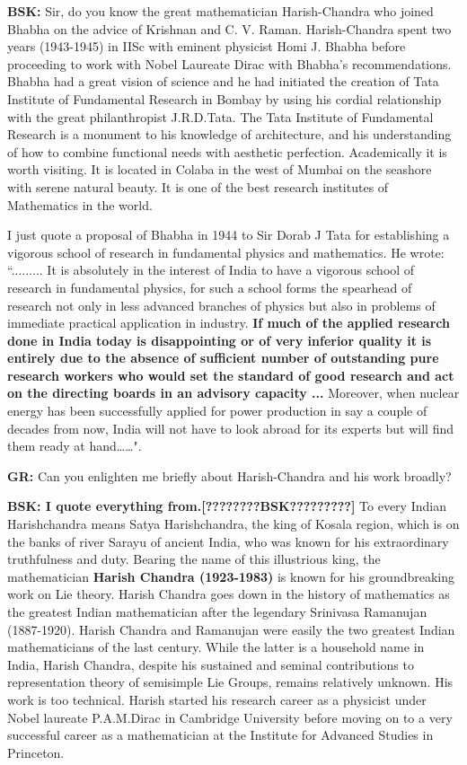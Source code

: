 \textbf{BSK:} Sir, do you know the great mathematician Harish-Chandra who joined Bhabha on the advice of Krishnan and C. V. Raman. Harish-Chandra spent two years (1943-1945) in IISc with eminent physicist Homi J. Bhabha before proceeding to work with Nobel Laureate Dirac with Bhabha’s recommendations.  Bhabha had a great vision of science and he had initiated the creation of Tata Institute of Fundamental Research in Bombay by using his cordial relationship with the great philanthropist J.R.D.Tata.  The Tata Institute of Fundamental Research is a monument to his knowledge of architecture, and his understanding of how to combine functional needs with aesthetic perfection. Academically it is worth visiting. It is located in Colaba in the west of Mumbai on the seashore with serene natural beauty. It is one of the best research institutes of Mathematics in the world.

I just quote a proposal \cite{chap13-key09SM} of Bhabha in 1944 to Sir Dorab J Tata for establishing a vigorous school of research in fundamental physics and mathematics.  He wrote:  ``......... It is absolutely in the interest of India to have a vigorous school of research in fundamental physics, for such a school forms the spearhead of research not only in less advanced branches of physics but also in problems of immediate practical application in industry. \textbf{If much of the applied research done in India today is disappointing or of very inferior quality it is entirely due to the absence of sufficient number of outstanding pure research workers who would set the standard of good research and act on the directing boards in an advisory capacity ...} Moreover, when nuclear energy has been successfully applied for power production in say a couple of decades from now, India will not have to look abroad for its experts but will find them ready at hand……".

\textbf{GR:} Can you enlighten me briefly about Harish-Chandra and his work broadly? 

\textbf{BSK: I quote everything from.[????????BSK?????????]} To every Indian Harishchandra means Satya Harishchandra, the king of Kosala region, which is on the banks of river Sarayu of ancient India, who was known for his extraordinary truthfulness and duty. Bearing the name of this illustrious king, the mathematician \textbf{Harish Chandra (1923-1983)} is known for his groundbreaking work on Lie theory. Harish Chandra goes down in the history of mathematics as the greatest Indian mathematician after the legendary Srinivasa Ramanujan (1887-1920). Harish Chandra and Ramanujan were easily the two greatest Indian mathematicians of the last century. While the latter is a household name in India, Harish Chandra, despite his sustained and seminal contributions to representation theory of semisimple Lie Groups, remains relatively unknown. His work is too technical. Harish started his research career as a physicist under Nobel laureate P.A.M.Dirac in Cambridge University before moving on to a very successful career as a mathematician at the Institute for Advanced Studies in Princeton.

